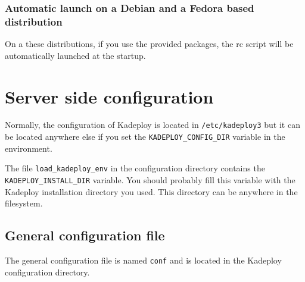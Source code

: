 \documentclass[a4wide,10pt,oneside]{book}
\begin{document}
\subsection{Automatic launch on a Debian and a Fedora based distribution}
\noindent On a these distributions, if you use the provided packages, the rc script will be automatically launched at the startup.

\chapter{Server side configuration}
Normally, the configuration of Kadeploy is located in \texttt{/etc/kadeploy3} but it can be located anywhere else if you set the \texttt{KADEPLOY\_CONFIG\_DIR} variable in the environment.

The file \texttt{load\_kadeploy\_env} in the configuration directory contains the \texttt{KADEPLOY\_INSTALL\_DIR} variable. You should probably fill this variable with the Kadeploy installation directory you used. This directory can be anywhere in the filesystem.

\section{General configuration file}\label{sec:general_config}
The general configuration file is named \texttt{conf} and is located in the Kadeploy configuration directory.
\end{document}
